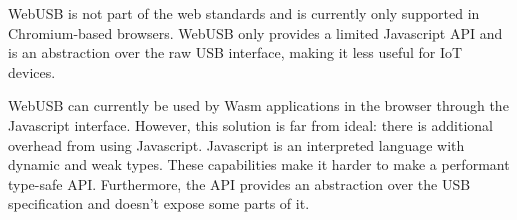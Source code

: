 WebUSB is not part of the web standards and is currently only supported in Chromium-based browsers. WebUSB only provides a limited Javascript API and is an abstraction over the raw USB interface, making it less useful for \acrshort{IoT} devices.

WebUSB can currently be used by \acrshort{Wasm} applications in the browser through the Javascript interface. However, this solution is far from ideal: there is additional overhead from using Javascript. Javascript is an interpreted language with dynamic and weak types. These capabilities make it harder to make a performant type-safe API. Furthermore, the API provides an abstraction over the USB specification and doesn't expose some parts of it.